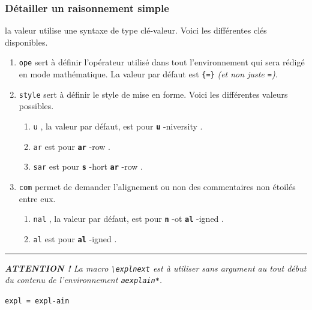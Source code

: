\documentclass[12pt,a4paper]{book}
\newcommand\env[1]{\texttt{#1}}
\newcommand\macro[1]{\env{\textbackslash{}#1}}
\theoremstyle{definition}
\newcommand\separation{
	\medskip
	\hfill\rule{0.5\textwidth}{0.75pt}\hfill
	\medskip
}
\newcommand\extraspace{
	\vspace{0.25em}
}
\newcommand\whyprefix[2]{%
	\textbf{\prefix{#1}}-#2%
}
\newcommand\mwhyprefix[2]{%
	\texttt{#1 = #1-#2}%
}
\newcommand\prefix[1]{%
	\texttt{#1}%
}
\begin{document}
{{\subsubsection{Détailler un raisonnement simple} 


\IDoption{} la valeur utilise une syntaxe de type clé-valeur. Voici les différentes clés disponibles.

\begin{enumerate}
	\item \verb+ope+ sert à définir l'opérateur utilisé dans tout l'environnement qui sera rédigé en mode mathématique. 
	      La valeur par défaut est \verb+{=}+ \emph{(et non juste \texttt{=})}.

	\item \verb+style+ sert à définir le style de mise en forme. Voici les différentes valeurs possibles.
	      \begin{enumerate}
	      		\item \prefix{u}, la valeur par défaut, est pour \whyprefix{u}{niversity}.

	      		\item \prefix{ar} est pour \whyprefix{ar}{row}.

	      		\item \prefix{sar} est pour \whyprefix{s}{hort} \whyprefix{ar}{row}.
	      \end{enumerate}

	\item \verb+com+ permet de demander l'alignement ou non des commentaires non étoilés entre eux.
	      \begin{enumerate}
	      		\item \prefix{nal}, la valeur par défaut, est pour \whyprefix{n}{ot} \whyprefix{al}{igned}.

	      		\item \prefix{al} est pour \whyprefix{al}{igned}.

	      \end{enumerate}
\end{enumerate}


\separation


\emph{\textbf{ATTENTION !} La macro \macro{explnext} est à utiliser sans argument au tout début du contenu de l'environnement \env{aexplain*}.}

\extraspace

\extraspace

 \hfill \mwhyprefix{expl}{ain}

}}
\end{document}
